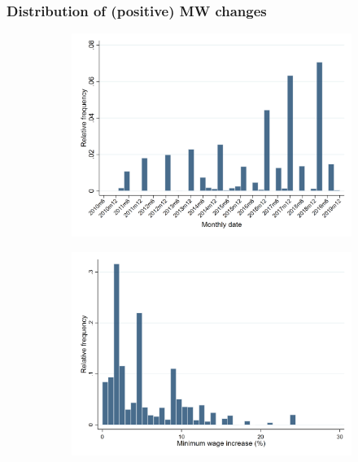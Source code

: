\documentclass[aspectratio=169, t]{beamer}
\begin{document}
\begin{frame}[label=dist_mw_changes]
    \frametitle{Distribution of (positive) MW changes}

    \vspace{-4mm}
    \begin{figure}
        \begin{subfigure}{0.51\textwidth}
            \vspace{6mm}
            \includegraphics[width = 1.02\textwidth]{estimation_samples/output/pct_ch_mw_date_dist.png}
        \end{subfigure}%
        \begin{subfigure}{0.51\textwidth}
            \includegraphics[width = 1.02\textwidth]{estimation_samples/output/pct_ch_mw_dist.png}
        \end{subfigure}
    \end{figure}
    
    \hyperlink{dist_mw_changes}{}
\end{frame}
\end{document}
